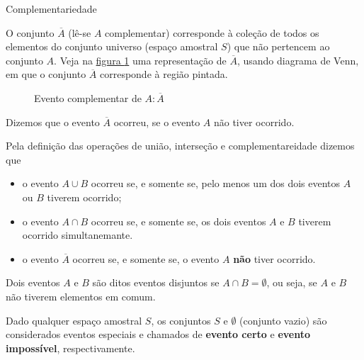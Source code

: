 \begin{observationtitle}{Complementariedade}

O conjunto \(\overline{A}\) (lê-se \(A\) complementar) corresponde à coleção de todos os elementos do conjunto universo (espaço amostral \(S\)) que não pertencem ao conjunto \(A\). Veja na \hyperref[complementar]{figura \ref{complementar}} uma representação de \(\overline{A}\), usando diagrama de Venn, em que o conjunto \(\overline{A}\) corresponde à região pintada.

\begin{figure}[H]
\centering

\caption{Evento complementar de \(A: \overline{A}\)}
\label{complementar}
\end{figure}

Dizemos que o evento \(\overline{A}\) ocorreu, se o evento \(A\) não tiver ocorrido.
\end{observationtitle}

Pela definição das operações de união, interseção e complementareidade dizemos que
\begin{itemize}
\item {} 
o evento \(A\cup B\)  ocorreu se, e somente se, pelo menos um dos dois eventos \(A\) ou \(B\) tiverem ocorrido;

\item {} 
o evento \(A\cap B\) ocorreu se, e somente se, os dois eventos \(A\) e \(B\) tiverem ocorrido simultanemante.

\item {} 
o evento \(\overline{A}\) ocorreu se, e somente se, o evento \(A\) \textbf{não} tiver ocorrido.

\end{itemize}

\begin{observation}
Dois eventos \(A\)  e \(B\) são ditos eventos disjuntos se $A\cap B=\emptyset$, ou seja, se \(A\) e \(B\) não tiverem elementos em comum.
\end{observation}

Dado qualquer espaço amostral \(S\), os conjuntos \(S\) e \(\emptyset\) (conjunto vazio) são considerados eventos especiais e chamados de \textbf{evento certo} e \textbf{evento impossível}, respectivamente.


